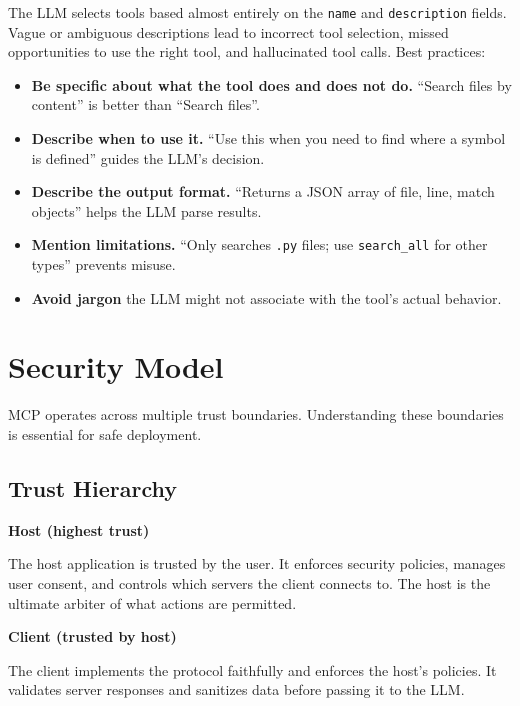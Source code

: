 \begin{warningbox}
The LLM selects tools based almost entirely on the \texttt{name} and \texttt{description} fields. Vague or ambiguous descriptions lead to incorrect tool selection, missed opportunities to use the right tool, and hallucinated tool calls. Best practices:

\begin{itemize}
  \item \textbf{Be specific about what the tool does and does not do.} ``Search files by content'' is better than ``Search files''.
  \item \textbf{Describe when to use it.} ``Use this when you need to find where a symbol is defined'' guides the LLM’s decision.
  \item \textbf{Describe the output format.} ``Returns a JSON array of {file, line, match} objects'' helps the LLM parse results.
  \item \textbf{Mention limitations.} ``Only searches \texttt{.py} files; use \texttt{search\_all} for other types'' prevents misuse.
  \item \textbf{Avoid jargon} the LLM might not associate with the tool’s actual behavior.
\end{itemize}
\end{warningbox}

\section{Security Model}
\label{sec:mcp:security}

MCP operates across multiple trust boundaries. Understanding these boundaries is essential for safe deployment.

\subsection{Trust Hierarchy}
\label{trust-hierarchy}

\textbf{Host (highest trust)}

The host application is trusted by the user. It enforces security policies, manages user consent, and controls which servers the client connects to. The host is the ultimate arbiter of what actions are permitted.

\textbf{Client (trusted by host)}

The client implements the protocol faithfully and enforces the host’s policies. It validates server responses and sanitizes data before passing it to the LLM.

